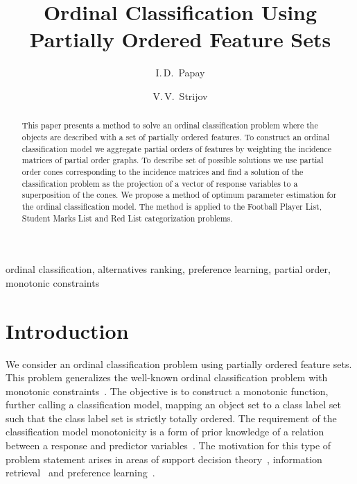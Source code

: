 \documentclass[12pt,preprint]{elsarticle}
\begin{document}
\title{Ordinal Classification Using Partially Ordered Feature Sets}
 

\author[mipt]{I.\,D.~Papay}

\author[mipt,ccas]{V.\,V.~Strijov}


\begin{abstract}
This paper presents a method to solve an ordinal classification problem where the objects are described with a set of partially ordered features.
To construct an ordinal classification model we aggregate partial orders of features by weighting the incidence matrices of partial order graphs. To describe set of possible solutions we use partial order cones corresponding to the incidence matrices and find a solution of the classification problem as the projection of a vector of response variables to a superposition of the cones. We propose a method of optimum parameter estimation for the ordinal classification model. The method is applied to the Football Player List, Student Marks List and Red List categorization problems.
\end{abstract}

\begin{keyword}
ordinal classification, alternatives ranking, preference learning, partial order, monotonic constraints
\end{keyword}

\maketitle

\section{Introduction}
We consider an ordinal classification problem using partially ordered feature sets. This problem generalizes the well-known ordinal classification problem with monotonic constraints~\cite{Kotlowski2013, Corrente2013, Ali2020}. The objective is to construct a monotonic function, further calling a classification model, mapping an object set to a class label set such that the class label set is strictly totally ordered. The requirement of the classification model monotonicity is a form of prior knowledge of a relation between a response and predictor variables~\cite{raey, Jorge2024, Eduardo2022}. The motivation for this type of problem statement arises in areas of support decision theory~\cite{Enrique2023,Ameed2022,Yossi2022}, information retrieval~\cite{Schafer2007,Trotman2005,Spirin2011} and preference learning~\cite{Fuernkranz2011, Bofei2024}.
\end{document}
